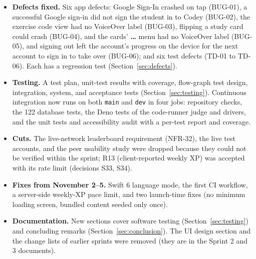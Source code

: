 \documentclass[12pt,letterpaper]{article}
\begin{document}
\begin{itemize}
        client writes). The app downloads them at launch and on return to the
        foreground (at most every 10 minutes), checks them with the same loaders as
        the bundle, keeps the last good copy, and falls back to the bundled JSON on
        a first launch offline, in demo mode, without backend keys, and in UI tests.
        Supabase holds 12 topics, 336 questions, 55 exercises, and 24 starter
        decks (288 cards); the bundle keeps 8, 176, 12, and 12 (144 cards). New
        content needs no app update: the Java, C++, Git, and Security topics were
        added on Nov 17 this way.
  \item \textbf{Defects fixed.} Six app defects: Google Sign-In crashed on tap
        (BUG-01), a successful Google sign-in did not sign the student in to Codey
        (BUG-02), the exercise code view had no VoiceOver label (BUG-03),
        flipping a study card could crash (BUG-04), and the cards' \textbf{\ldots}
        menu had no VoiceOver label (BUG-05), and signing out left the account's
        progress on the device for the next account to sign in to take over (BUG-06); and six test defects (TD-01 to
        TD-06). Each has a regression test (Section~\ref{sec:defects}).
  \item \textbf{Testing.} A test plan, unit-test results with coverage, flow-graph
        test design, integration, system, and acceptance tests
        (Section~\ref{sec:testing}). Continuous integration now runs on both
        \texttt{main} and \texttt{dev} in four jobs: repository checks, the 122
        database tests, the Deno tests of the code-runner judge and drivers, and the unit tests and accessibility audit with a per-test
        report and coverage.
  \item \textbf{Cuts.} The live-network leaderboard requirement (NFR-32), the live
        test accounts, and the peer usability study were dropped because they could
        not be verified within the sprint; R13 (client-reported weekly XP) was
        accepted with its rate limit (decisions S33, S34).
  \item \textbf{Fixes from November 2--5.} Swift 6 language mode, the first CI
        workflow, a server-side weekly-XP pace limit, and two launch-time fixes
        (no minimum loading screen, bundled content seeded only once).
  \item \textbf{Documentation.} New sections cover software testing
        (Section~\ref{sec:testing}) and concluding remarks
        (Section~\ref{sec:conclusion}). The UI design section and the change lists
        of earlier sprints were removed (they are in the Sprint 2 and 3 documents).
\end{itemize}
\end{document}
